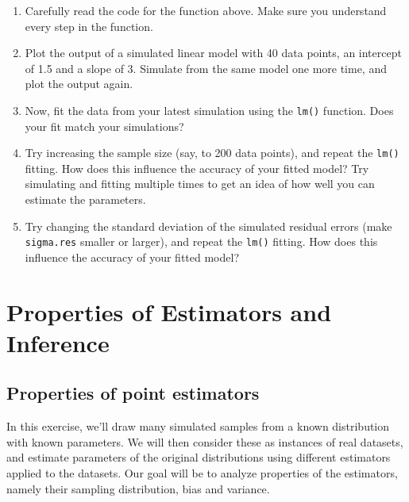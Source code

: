 \documentclass[
]{book}
\providecommand{\tightlist}{%
  \setlength{\itemsep}{0pt}\setlength{\parskip}{0pt}}
\begin{document}
\begin{enumerate}
\def\labelenumi{\alph{enumi})}
\tightlist
\item
  Carefully read the code for the function above. Make sure you understand every step in the function.\\
\item
  Plot the output of a simulated linear model with 40 data points, an intercept of 1.5 and a slope of 3. Simulate from the same model one more time, and plot the output again.\\
\item
  Now, fit the data from your latest simulation using the \texttt{lm()} function. Does your fit match your simulations?\\
\item
  Try increasing the sample size (say, to 200 data points), and repeat the \texttt{lm()} fitting. How does this influence the accuracy of your fitted model? Try simulating and fitting multiple times to get an idea of how well you can estimate the parameters.\\
\item
  Try changing the standard deviation of the simulated residual errors (make \texttt{sigma.res} smaller or larger), and repeat the \texttt{lm()} fitting. How does this influence the accuracy of your fitted model?
\end{enumerate}

\hypertarget{properties-of-estimators-and-inference}{%
\chapter{Properties of Estimators and Inference}\label{properties-of-estimators-and-inference}}

\hypertarget{properties-of-point-estimators}{%
\section{Properties of point estimators}\label{properties-of-point-estimators}}

In this exercise, we'll draw many simulated samples from a known distribution with known parameters. We will then consider these as instances of real datasets, and estimate parameters of the original distributions using different estimators applied to the datasets. Our goal will be to analyze properties of the estimators, namely their sampling distribution, bias and variance.
\end{document}

